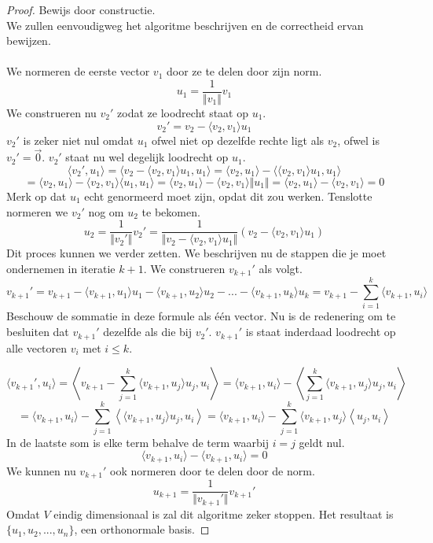 \documentclass[lineaire_algebra_oplossingen.tex]{subfiles}
\begin{document}
\begin{proof}
Bewijs door constructie.\\
We zullen eenvoudigweg het algoritme beschrijven en de correctheid ervan bewijzen.\\\\
We normeren de eerste vector $v_1$ door ze te delen door zijn norm.
\[
u_1 = \frac{1}{\Vert v_1\Vert}v_1
\]
We construeren nu $v_2'$ zodat ze loodrecht staat op $u_1$.
\[
v_2' = v_2 - \langle v_2,v_1\rangle u_1
\]
$v_2'$ is zeker niet nul omdat $u_1$ ofwel niet op dezelfde rechte ligt als $v_2$, ofwel is $v_2' = \vec{0}$. $v_2'$ staat nu wel degelijk loodrecht op $u_1$.
\[
\langle v_2',u_1\rangle = \langle v_2 - \langle v_2,v_1\rangle u_1,u_1\rangle = \langle v_2,u_1\rangle - \langle\langle v_2,v_1\rangle u_1,u_1\rangle
\]
\[
= \langle v_2,u_1\rangle - \langle v_2,v_1\rangle \langle u_1,u_1\rangle = \langle v_2,u_1\rangle - \langle v_2,v_1\rangle \Vert u_1\Vert = \langle v_2,u_1\rangle - \langle v_2,v_1\rangle = 0
\]
Merk op dat $u_1$ echt genormeerd moet zijn, opdat dit zou werken. Tenslotte normeren we $v_2'$ nog om $u_2$ te bekomen.
\[
u_2 = \frac{1}{\Vert v_2'\Vert}v_2' = \frac{1}{\Vert v_2 - \langle v_2,v_1\rangle u_1\Vert}(v_2 - \langle v_2,v_1\rangle u_1)
\]
Dit proces kunnen we verder zetten. We beschrijven nu de stappen die je moet ondernemen in iteratie $k+1$.
We construeren $v_{k+1}'$ als volgt.
\[
v_{k+1}' = v_{k+1} - \langle v_{k+1},u_1 \rangle u_1 - \langle v_{k+1},u_2 \rangle u_2 - ... - \langle v_{k+1},u_k \rangle u_k
= v_{k+1} - \sum_{i=1}^k \langle v_{k+1},u_i \rangle
\]
Beschouw de sommatie in deze formule als \'e\'en vector. Nu is de redenering om te besluiten dat $v_{k+1}'$ dezelfde als die bij $v_2'$.
$v_{k+1}'$ is staat inderdaad loodrecht op alle vectoren $v_i$ met $i\le k$.

\[
\langle v_{k+1}',u_i\rangle  = \left\langle v_{k+1} - \sum_{j=1}^k \langle v_{k+1},u_j \rangle u_j,u_i\right\rangle
=
\langle v_{k+1},u_i\rangle -
\left\langle \sum_{j=1}^k \langle v_{k+1},u_j \rangle u_j,u_i\right\rangle
\]
\[
=
\langle v_{k+1},u_i\rangle -
\sum_{j=1}^k
\left\langle  \langle v_{k+1},u_j \rangle u_j,u_i\right\rangle
=
\langle v_{k+1},u_i\rangle -
\sum_{j=1}^k
\langle v_{k+1},u_j \rangle
\left\langle u_j,u_i\right\rangle
\]
In de laatste som is elke term behalve de term waarbij $i=j$ geldt nul.
\[
\langle v_{k+1},u_i\rangle -
\langle v_{k+1},u_i\rangle
=0
\]
We kunnen nu $v_{k+1}'$ ook normeren door te delen door de norm.
\[
u_{k+1} = \frac{1}{\Vert v_{k+1}'\Vert}v_{k+1}'
\]
Omdat $V$ eindig dimensionaal is zal dit algoritme zeker stoppen. Het resultaat is $\{u_1,u_2,...,u_n\}$, een orthonormale basis.
\end{proof}
\end{document}
